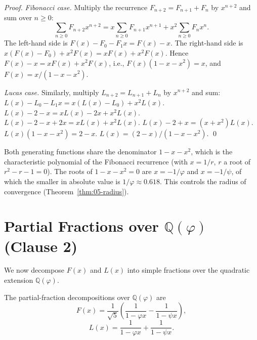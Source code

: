 \begin{proof}
\emph{Fibonacci case.} Multiply the recurrence $F_{n+2} = F_{n+1} + F_n$
by $x^{n+2}$ and sum over $n \ge 0$:
\[
  \sum_{n \ge 0} F_{n+2} x^{n+2} = x \sum_{n \ge 0} F_{n+1} x^{n+1} + x^2 \sum_{n \ge 0} F_n x^n.
\]
The left-hand side is $F(x) - F_0 - F_1 x = F(x) - x$. The right-hand
side is $x (F(x) - F_0) + x^2 F(x) = x F(x) + x^2 F(x)$. Hence
$F(x) - x = x F(x) + x^2 F(x)$, i.e., $F(x)(1 - x - x^2) = x$, and
$F(x) = x / (1 - x - x^2)$.

\emph{Lucas case.} Similarly, multiply $L_{n+2} = L_{n+1} + L_n$ by
$x^{n+2}$ and sum:
$L(x) - L_0 - L_1 x = x (L(x) - L_0) + x^2 L(x)$.
$L(x) - 2 - x = x L(x) - 2x + x^2 L(x)$.
$L(x) - 2 - x + 2x = x L(x) + x^2 L(x)$.
$L(x) - 2 + x = (x + x^2) L(x)$.
$L(x)(1 - x - x^2) = 2 - x$.
$L(x) = (2 - x)/(1 - x - x^2)$. \qed
\end{proof}

\begin{remark}
Both generating functions share the denominator $1 - x - x^2$, which
is the characteristic polynomial of the Fibonacci recurrence (with
$x = 1/r$, $r$ a root of $r^2 - r - 1 = 0$). The roots of
$1 - x - x^2 = 0$ are $x = -1/\varphi$ and $x = -1/\psi$, of which
the smaller in absolute value is $1/\varphi \approx 0.618$. This
controls the radius of convergence (Theorem~\ref{thm:05-radius}).
\end{remark}

\section{Partial Fractions over $\mathbb{Q}(\varphi)$ (Clause 2)}
\label{sec:05-partial-frac}

We now decompose $F(x)$ and $L(x)$ into simple fractions over the
quadratic extension $\mathbb{Q}(\varphi)$.

\begin{theorem}
\label{thm:05-partial-frac}
The partial-fraction decompositions over $\mathbb{Q}(\varphi)$ are
\[
  F(x) = \frac{1}{\sqrt{5}} \left( \frac{1}{1 - \varphi x} - \frac{1}{1 - \psi x} \right),
\]
\[
  L(x) = \frac{1}{1 - \varphi x} + \frac{1}{1 - \psi x}.
\]
\end{theorem}

